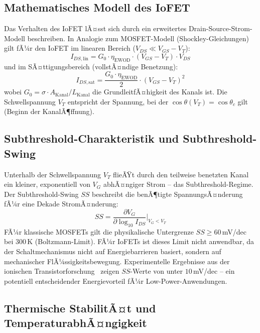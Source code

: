 ﻿\documentclass[a4paper,12pt]{scrreprt}
\theoremstyle{definition}
\begin{document}
\subsection{Mathematisches Modell des IoFET}

Das Verhalten des IoFET lÃ¤sst sich durch ein erweitertes Drain-Source-Strom-Modell
beschreiben. In Analogie zum MOSFET-Modell (Shockley-Gleichungen) gilt fÃ¼r den
IoFET im linearen Bereich ($V_{DS} \ll V_{GS} - V_T$):
\begin{equation}
	I_{DS,\mathrm{lin}} = G_0 \cdot \eta_{\mathrm{EWOD}} \cdot (V_{GS} - V_T) \cdot V_{DS}
	\label{eq:iofet_linear}
\end{equation}
und im SÃ¤ttigungsbereich (vollstÃ¤ndige Benetzung):
\begin{equation}
	I_{DS,\mathrm{sat}} = \frac{G_0 \cdot \eta_{\mathrm{EWOD}}}{2} \cdot (V_{GS} - V_T)^2
	\label{eq:iofet_saettigung}
\end{equation}
wobei $G_0 = \sigma \cdot A_{\mathrm{Kanal}} / L_{\mathrm{Kanal}}$ die GrundleitfÃ¤higkeit
des Kanals ist. Die Schwellspannung $V_T$ entspricht der Spannung, bei der
$\cos\theta(V_T) = \cos\theta_c$ gilt (Beginn der KanalÃ¶ffnung).

\subsection{Subthreshold-Charakteristik und Subthreshold-Swing}

Unterhalb der Schwellspannung $V_T$ flieÃŸt durch den teilweise benetzten
Kanal ein kleiner, exponentiell von $V_G$ abhÃ¤ngiger Strom -- das
Subthreshold-Regime. Der Subthreshold-Swing $SS$ beschreibt die benÃ¶tigte
SpannungsÃ¤nderung fÃ¼r eine Dekade StromÃ¤nderung:
\begin{equation}
	SS = \frac{\partial V_G}{\partial \log_{10} I_{DS}}
	\bigg|_{V_G < V_T}
	\label{eq:subthreshold_swing}
\end{equation}
FÃ¼r klassische MOSFETs gilt die physikalische Untergrenze
$SS \geq 60$\,mV/dec bei 300\,K (Boltzmann-Limit). FÃ¼r IoFETs ist dieses
Limit nicht anwendbar, da der Schaltmechanismus nicht auf Energiebarrieren
basiert, sondern auf mechanischer FlÃ¼ssigkeitsbewegung. Experimentelle
Ergebnisse aus der ionischen Transistorforschung~\cite{xu2021} zeigen
$SS$-Werte von unter $10$\,mV/dec -- ein potentiell entscheidender
Energievorteil fÃ¼r Low-Power-Anwendungen.

\subsection{Thermische StabilitÃ¤t und TemperaturabhÃ¤ngigkeit}
\end{document}
